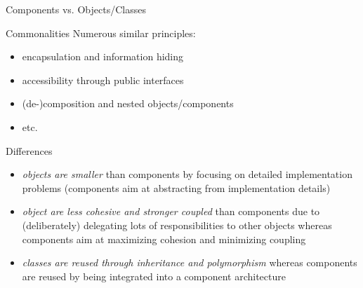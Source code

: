 \begin{frame}{Components vs. Objects/Classes} %
	\begin{mycolumns}[widths={33},animation=none]
		\begin{note}{Commonalities}	
			Numerous similar principles:
			\begin{itemize}
				\item encapsulation and information hiding
				\item accessibility through public interfaces
				\item (de-)composition and nested objects/components
				\item etc.
			\end{itemize}
		\end{note}
		\pause
	\mynextcolumn
		\begin{note}{Differences}
			\begin{itemize}
				\item \emph{objects are smaller} than components by focusing on detailed implementation problems (components aim at abstracting from implementation details)
				\item \emph{object are less cohesive and stronger coupled} than components due to (deliberately) delegating lots of responsibilities to other objects whereas components aim at maximizing cohesion and minimizing coupling
				\item \emph{classes are reused through inheritance and polymorphism} whereas components are reused by being integrated into a component architecture
			\end{itemize}			
		\end{note}
	\end{mycolumns}	
\end{frame}

